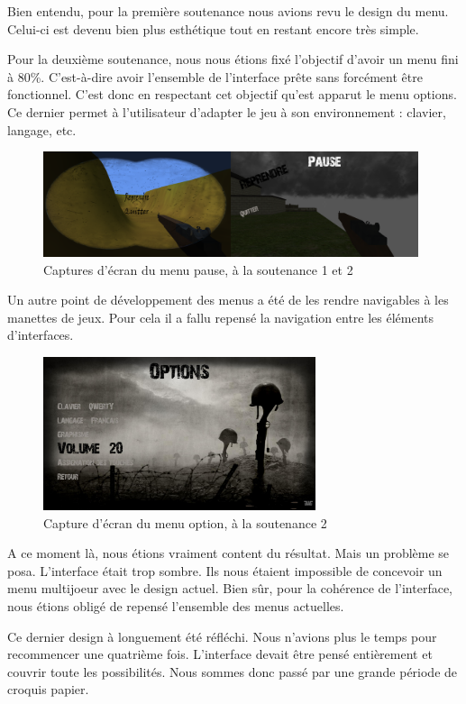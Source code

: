 \documentclass[11pt]{report}
\begin{document}
Bien entendu, pour la première soutenance nous avions revu le design du menu. Celui-ci est devenu bien plus esthétique tout en restant encore très simple.

Pour la deuxième soutenance, nous nous étions fixé l'objectif d'avoir un menu fini à 80\%. C'est-à-dire avoir l'ensemble de l'interface prête sans forcément être fonctionnel. C'est donc en respectant cet objectif qu'est apparut le menu options. Ce dernier permet à l'utilisateur d'adapter le jeu à son environnement : clavier, langage, etc.

\begin{figure}[htbp]
\centering
\includegraphics[width=11cm]{menu-pause-1et2.png}
\caption{Captures d'écran du menu pause, à la soutenance 1 et 2}
\end{figure}

Un autre point de développement des menus a été de les rendre navigables à les manettes de jeux. Pour cela il a fallu repensé la navigation entre les éléments d'interfaces.

\begin{figure}[htbp]
\centering
\includegraphics[width=8cm]{option-menu-2.jpg}
\caption{Capture d'écran du menu option, à la soutenance 2}
\end{figure}

A ce moment là, nous étions vraiment content du résultat. Mais un problème se posa. L'interface était trop sombre. Ils nous étaient impossible de concevoir un menu multijoeur avec le design actuel. Bien sûr, pour la cohérence de l'interface, nous étions obligé de repensé l'ensemble des menus actuelles.

Ce dernier design à longuement été réfléchi. Nous n'avions plus le temps pour recommencer une quatrième fois. L'interface devait être pensé entièrement et couvrir toute les possibilités. Nous sommes donc passé par une grande période de croquis papier.
\end{document}
